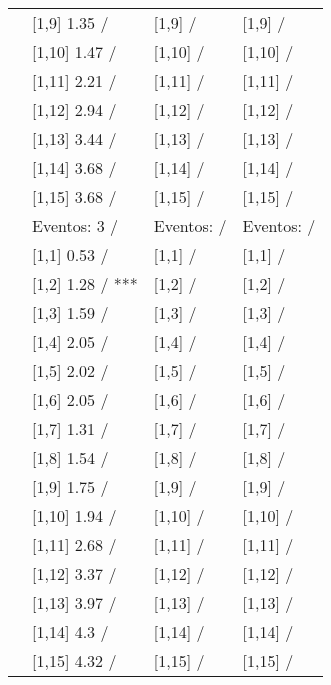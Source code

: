 \begin{table}
\begin{tabular}[t]{llll}
\addlinespace
 & {}[1,9] 1.35  / & {}[1,9]  / & {}[1,9]  /\\
 & {}[1,10] 1.47  / & {}[1,10]  / & {}[1,10]  /\\
 & {}[1,11] 2.21  / & {}[1,11]  / & {}[1,11]  /\\
 & {}[1,12] 2.94  / & {}[1,12]  / & {}[1,12]  /\\
 & {}[1,13] 3.44  / & {}[1,13]  / & {}[1,13]  /\\
\addlinespace
 & {}[1,14] 3.68  / & {}[1,14]  / & {}[1,14]  /\\
 & {}[1,15] 3.68  / & {}[1,15]  / & {}[1,15]  /\\
 & Eventos:  3 / & Eventos:   / & Eventos:   /\\
 & {}[1,1] 0.53  / & {}[1,1]  / & {}[1,1]  /\\
 & {}[1,2] 1.28  / *** & {}[1,2]  / & {}[1,2]  /\\
\addlinespace
 & {}[1,3] 1.59  / & {}[1,3]  / & {}[1,3]  /\\
 & {}[1,4] 2.05  / & {}[1,4]  / & {}[1,4]  /\\
 & {}[1,5] 2.02  / & {}[1,5]  / & {}[1,5]  /\\
 & {}[1,6] 2.05  / & {}[1,6]  / & {}[1,6]  /\\
 & {}[1,7] 1.31  / & {}[1,7]  / & {}[1,7]  /\\
\addlinespace
500 & {}[1,8] 1.54  / & {}[1,8]  / & {}[1,8]  /\\
 & {}[1,9] 1.75  / & {}[1,9]  / & {}[1,9]  /\\
 & {}[1,10] 1.94  / & {}[1,10]  / & {}[1,10]  /\\
 & {}[1,11] 2.68  / & {}[1,11]  / & {}[1,11]  /\\
 & {}[1,12] 3.37  / & {}[1,12]  / & {}[1,12]  /\\
\addlinespace
 & {}[1,13] 3.97  / & {}[1,13]  / & {}[1,13]  /\\
 & {}[1,14] 4.3  / & {}[1,14]  / & {}[1,14]  /\\
 & {}[1,15] 4.32  / & {}[1,15]  / & {}[1,15]  /\\
\bottomrule
\end{tabular}
\end{table}
